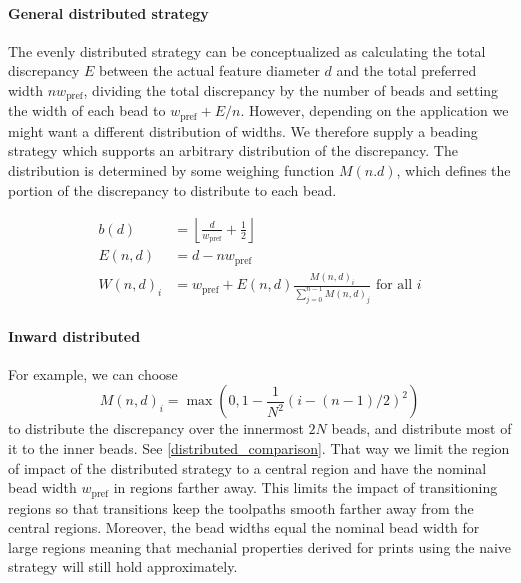 \paragraph{General distributed strategy}
The evenly distributed strategy can be conceptualized as calculating the total discrepancy $E$ between the actual feature diameter $d$ and the total preferred width $n w_\text{pref}$, dividing the total discrepancy by the number of beads and setting the width of each bead to 
$w_\text{pref} + E / n$.
However, depending on the application we might want a different distribution of widths.
We therefore supply a beading strategy which supports an arbitrary distribution of the discrepancy.
The distribution is determined by some weighing function $M(n.d)$, which defines the portion of the discrepancy to distribute to each bead.


\begin{align*}
b(d) &= \left\lfloor \frac{d}{ w_\text{pref}} + \frac12 \right\rfloor \\
E(n,d) &= d - n w_\text{pref} \\
W(n,d)_i &= w_\text{pref} + E(n,d) \frac{M(n,d)_i}{\sum_{j=0}^{n-1} M(n,d)_j} \text{ for all } i 
\end{align*}


\paragraph{Inward distributed}
For example, we can choose 
$$M(n,d)_i = \max(0, 1 - \frac{1}{N^2} (i - (n-1)/2)^2 )$$
to distribute the discrepancy over the innermost $2N$ beads, and distribute most of it to the inner beads.
See \cref{distributed_comparison}.
That way we limit the region of impact of the distributed strategy to a central region and have the nominal bead width $w_\text{pref}$ in regions farther away.
This limits the impact of transitioning regions so that transitions keep the toolpaths smooth farther away from the central regions. %
Moreover, the bead widths equal the nominal bead width for large regions meaning that mechanial properties derived for prints using the naive strategy will still hold approximately.



